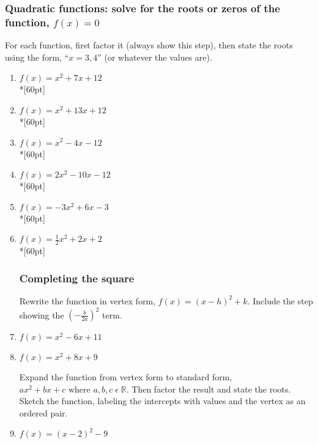 \documentclass[12pt, oneside]{article}
\begin{document}
\subsubsection*{Quadratic functions: solve for the roots or zeros of the function, $f(x)=0$}

For each function, first factor it (always show this step), then state the roots using the form, ``$x=3,4$'' (or whatever the values are).

\begin{enumerate}

\item   $f(x)=x^2+7x+12$\\*[60pt]
\item   $f(x)=x^2+13x+12$\\*[60pt]
\item   $f(x)=x^2-4x-12$\\*[60pt]
\item   $f(x)=2x^2-10x-12$\\*[60pt]
\item   $f(x)=-3x^2+6x-3$\\*[60pt]
\item   $f(x)=\frac{1}{2}x^2+2x+2$\\*[60pt]

\subsubsection*{Completing the square}

Rewrite the function in vertex form, $f(x)=(x-h)^2+k$. Include the step showing the $(-\frac{b}{2a})^2$ term.
\item   $f(x)=x^2-6x+11$
\vspace{3cm}
\item   $f(x)=x^2+8x+9$
\vspace{3cm}

Expand the function from vertex form to standard form, $ax^2+bx+c \text{ where } a, b, c \;  \epsilon \; \mathbb{R}$. Then factor the result and state the roots. Sketch the function, labeling the intercepts with values and the vertex as an ordered pair.
\item   $f(x)=(x-2)^2-9$
  \begin{flushright} %
  \end{flushright}


\end{enumerate}
\end{document}
